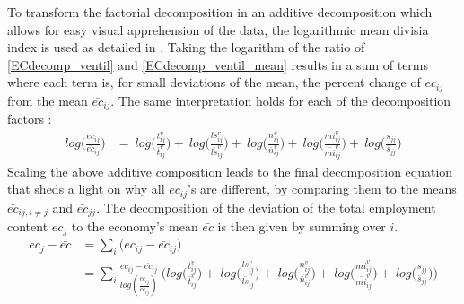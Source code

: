 \documentclass[12pt,english]{article}
\begin{document}
To transform the factorial decomposition in an additive decomposition which allows for easy visual apprehension of the data, the logarithmic mean divisia index is used as detailed in \citep{ang2005lmdi}. Taking the logarithm of the ratio of \ref{ECdecomp_ventil} and \ref{ECdecomp_ventil_mean} results in a sum of terms where each term is, for small deviations of the mean, the percent change of $ec_{ij}$ from the mean $\bar{ec}_{ij}$. The same interpretation holds for each of the decomposition factors :
\begin{align}
log\bigg(\frac{ec_{ij}}{\bar{ec}_{ij}}\bigg) &=  \ log\bigg(\frac{t^v_{ij}}{\bar{t}^v_{ij}}\bigg) +\ log\bigg(\frac{ls^v_{ij}}{\bar{ls}^v_{ij}}\bigg) +\ log\bigg(\frac{n^v_{ij}}{\bar{n}^v_{ij}} \bigg) +\ log\bigg(\frac{mi^v_{ij}}{\bar{mi}^v_{ij}}\bigg)  +\ log\bigg(\frac{s_{jj}}{\bar{s}_{jj}}\bigg)  %
\end{align}
Scaling the above additive composition leads to the final decomposition equation that sheds a light on why all $ec_{ij}$'s are different, by comparing them to the means $\bar{ec}_{ij, i\neq j}$ and $\bar{ec}_{jj}$. The decomposition of the deviation of the total employment content $ec_j$ to the economy's mean $\bar{ec}$ is then given by summing over $i$. 
\begin{align}
ec_j - \bar{ec} &= \sum_i \big( ec_{ij} - \bar{ec}_{ij} \big) \nonumber \\
&= \sum_i \frac{ec_{ij} - \bar{ec}_{ij}}{log(\frac{ec_{ij}}{\bar{ec}_{ij}})}\ \Bigg( log\bigg(\frac{t^v_{ij}}{\bar{t}^v_{ij}}\bigg) +\ log\bigg(\frac{ls^v_{ij}}{\bar{ls}^v_{ij}}\bigg) +\ log\bigg(\frac{n^v_{ij}}{\bar{n}^v_{ij}} \bigg) +\ log\bigg(\frac{mi^v_{ij}}{\bar{mi}^v_{ij}}\bigg)  +\ log\bigg(\frac{s_{jj}}{\bar{s}_{jj}}\bigg) \Bigg)  \label{ECdecomp_ventil_final}
\end{align}
\end{document}
